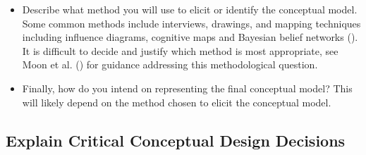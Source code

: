 \documentclass[
]{article}
\providecommand{\tightlist}{%
  \setlength{\itemsep}{0pt}\setlength{\parskip}{0pt}}
\begin{document}
\begin{tcolorbox}[enhanced jigsaw, opacitybacktitle=0.6, bottomrule=.15mm, leftrule=.75mm, rightrule=.15mm, colbacktitle=quarto-callout-caution-color!10!white, toprule=.15mm, titlerule=0mm, left=2mm, colframe=quarto-callout-caution-color-frame, breakable, title=\textcolor{quarto-callout-caution-color}{\faFire}\hspace{0.5em}{Preregistration Item}, opacityback=0, coltitle=black, bottomtitle=1mm, colback=white, toptitle=1mm, arc=.35mm]

\begin{itemize}
\tightlist
\item[$\square$]
  Describe what method you will use to elicit or identify the conceptual
  model. Some common methods include interviews, drawings, and mapping
  techniques including influence diagrams, cognitive maps and Bayesian
  belief networks (). It is
  difficult to decide and justify which method is most appropriate, see
  Moon et al. () for guidance addressing
  this methodological question.
\item[$\square$]
  Finally, how do you intend on representing the final conceptual model?
  This will likely depend on the method chosen to elicit the conceptual
  model.
\end{itemize}

\end{tcolorbox}

\subsection{Explain Critical Conceptual Design
Decisions}\label{explain-critical-conceptual-design-decisions}
\end{document}
